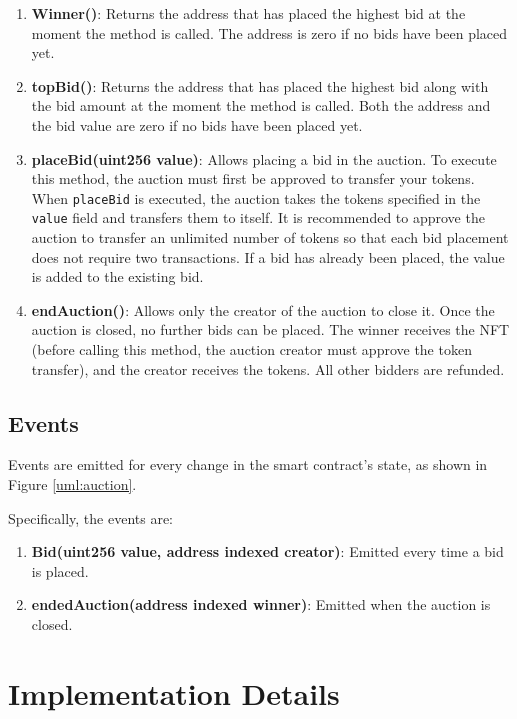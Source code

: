 \documentclass[conference]{IEEEtran}
\begin{document}
\begin{enumerate}
\item \textbf{Winner()}:
Returns the address that has placed the highest bid at the moment the method is called. The address is zero if no bids have been placed yet.

\item \textbf{topBid()}:  
Returns the address that has placed the highest bid along with the bid amount at the moment the method is called. Both the address and the bid value are zero if no bids have been placed yet.

\item \textbf{placeBid(uint256 value)}:  
Allows placing a bid in the auction. To execute this method, the auction must first be approved to transfer your tokens. When \texttt{placeBid} is executed, the auction takes the tokens specified in the \texttt{value} field and transfers them to itself. It is recommended to approve the auction to transfer an unlimited number of tokens so that each bid placement does not require two transactions. If a bid has already been placed, the value is added to the existing bid.

\item \textbf{endAuction()}:  
Allows only the creator of the auction to close it. Once the auction is closed, no further bids can be placed. The winner receives the NFT (before calling this method, the auction creator must approve the token transfer), and the creator receives the tokens. All other bidders are refunded.
\end{enumerate}

\subsection{Events}

Events are emitted for every change in the smart contract's state, as shown in Figure \ref{uml:auction}.

Specifically, the events are:

\begin{enumerate}
\item \textbf{Bid(uint256 value, address indexed creator)}:
Emitted every time a bid is placed.
\item \textbf{endedAuction(address indexed winner)}:  
Emitted when the auction is closed.  
\end{enumerate}

\section{Implementation Details}
\end{document}
